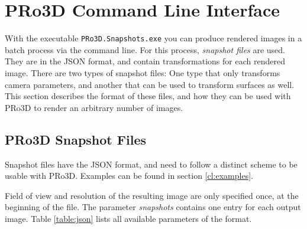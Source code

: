 \section{PRo3D Command Line Interface}\label{sec:CLI}

With the executable \texttt{PRo3D.Snapshots.exe} you can produce rendered images in a batch process via the command line. For this process, \emph{snapshot files} are used. They are in the JSON format, and contain transformations for each rendered image. There are two types of snapshot files: One type that only transforms camera parameters, and another that can be used to transform surfaces as well. This section describes the format of these files, and how they can be used with PRo3D to render an arbitrary number of images.


\subsection{PRo3D Snapshot Files}
\label{sec:snapshots}

Snapshot files have the JSON format, and need to follow a distinct scheme to be usable with PRo3D. Examples can be found in section \ref{cl:examples}.

Field of view and resolution of the resulting image are only specified once, at the beginning of the file. The parameter \textit{snapshots} contains one entry for each output image. Table  \ref{table:json} lists all available parameters of the format.


